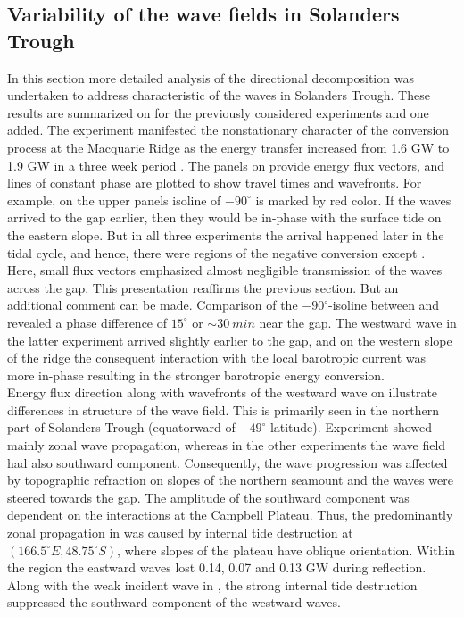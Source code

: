 \documentclass[12pt]{article}
\begin{document}
\subsection{Variability of the wave fields in Solanders Trough}
\label{C3.sec:3d_var}
In this section more detailed analysis of the directional decomposition was 
undertaken to address characteristic of the waves in Solanders Trough. These results are summarized 
on 
 for the previously considered 
experiments and one added. The experiment  manifested the nonstationary 
character of the conversion process at the Macquarie Ridge as the energy transfer increased from 
1.6 GW to 1.9 GW in a three week period . The panels on 
provide energy flux vectors, and lines of constant phase are plotted to show travel times and  
wavefronts. For example, on the upper panels isoline of $-90^{\circ}$ is marked by red color. If 
the 
waves arrived to the gap earlier, then they would be in-phase with the surface tide on the eastern 
slope. But in all three experiments the arrival 
happened later in the tidal cycle, and hence, there were regions of the negative conversion except 
. Here, small flux vectors emphasized almost negligible transmission 
of the waves across the gap. This presentation reaffirms the previous section. But an 
additional comment can be made. Comparison of the $-90^{\circ}$-isoline between  and 
 revealed a phase difference of $15^{\circ}$ or $\sim30~min$ near the gap. The westward 
wave in the latter experiment arrived slightly earlier to the gap, and on the western slope of the 
ridge the consequent interaction with the local barotropic current was more in-phase resulting in 
the stronger barotropic energy conversion.\\

Energy flux direction along with wavefronts of the westward wave on 
 illustrate differences in structure of the wave field. This is 
primarily seen in the northern part of Solanders Trough (equatorward of $-49^{\circ}$ latitude). 
Experiment 
 showed mainly zonal wave propagation, whereas in the other experiments the wave field  
had also southward component. Consequently, the wave progression was affected by topographic 
refraction on slopes of the northern seamount and the waves were steered towards the gap. The 
amplitude 
of the southward component was dependent on the interactions at the Campbell Plateau. 
Thus, the predominantly zonal propagation in  was caused by internal 
tide 
destruction at $(166.5^{\circ}E, 48.75^{\circ}S)$,  where 
slopes of the plateau have oblique orientation. Within the region the eastward waves lost 
0.14, 0.07 and 0.13 GW during reflection. Along 
with the weak incident wave  in , the strong internal tide 
destruction suppressed the southward component of the westward waves.\\
\end{document}
